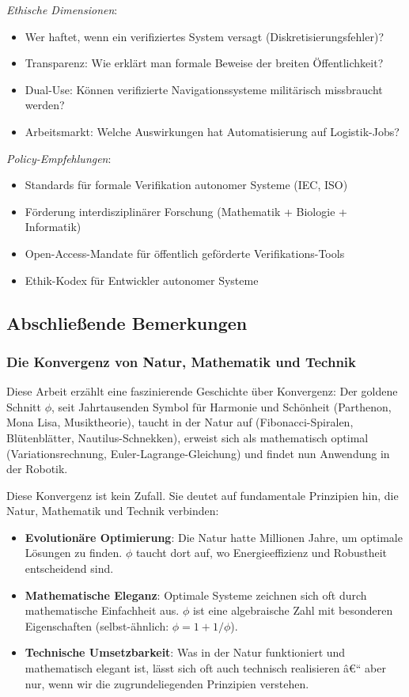 ﻿\documentclass[a4paper,12pt]{article}
\theoremstyle{definition}
\begin{document}
\textit{Ethische Dimensionen}:
\begin{itemize}
	\item Wer haftet, wenn ein verifiziertes System versagt (Diskretisierungsfehler)?
	\item Transparenz: Wie erklärt man formale Beweise der breiten Öffentlichkeit?
	\item Dual-Use: Können verifizierte Navigationssysteme militärisch missbraucht werden?
	\item Arbeitsmarkt: Welche Auswirkungen hat Automatisierung auf Logistik-Jobs?
\end{itemize}

\textit{Policy-Empfehlungen}:
\begin{itemize}
	\item Standards für formale Verifikation autonomer Systeme (IEC, ISO)
	\item Förderung interdisziplinärer Forschung (Mathematik + Biologie + Informatik)
	\item Open-Access-Mandate für öffentlich geförderte Verifikations-Tools
	\item Ethik-Kodex für Entwickler autonomer Systeme
\end{itemize}

\subsection{Abschließende Bemerkungen}

\subsubsection{Die Konvergenz von Natur, Mathematik und Technik}

Diese Arbeit erzählt eine faszinierende Geschichte über Konvergenz: Der goldene Schnitt $\phi$, seit Jahrtausenden Symbol für Harmonie und Schönheit (Parthenon, Mona Lisa, Musiktheorie), taucht in der Natur auf (Fibonacci-Spiralen, Blütenblätter, Nautilus-Schnek\-ken), erweist sich als mathematisch optimal (Variationsrechnung, Euler-Lagrange-Glei\-chung) und findet nun Anwendung in der Robotik.

Diese Konvergenz ist kein Zufall. Sie deutet auf fundamentale Prinzipien hin, die Natur, Mathematik und Technik verbinden:

\begin{itemize}
	\item \textbf{Evolutionäre Optimierung}: Die Natur hatte Millionen Jahre, um optimale Lö\-sung\-en zu finden. $\phi$ taucht dort auf, wo Energieeffizienz und Robustheit entscheidend sind.
	
	\item \textbf{Mathematische Eleganz}: Optimale Systeme zeichnen sich oft durch mathematische Einfachheit aus. $\phi$ ist eine algebraische Zahl mit besonderen Eigenschaften (selbst-ähnlich: $\phi = 1 + 1/\phi$).
	
	\item \textbf{Technische Umsetzbarkeit}: Was in der Natur funktioniert und mathematisch elegant ist, lässt sich oft auch technisch realisieren â€“ aber nur, wenn wir die zugrundeliegenden Prinzipien verstehen.
\end{itemize}
\end{document}
